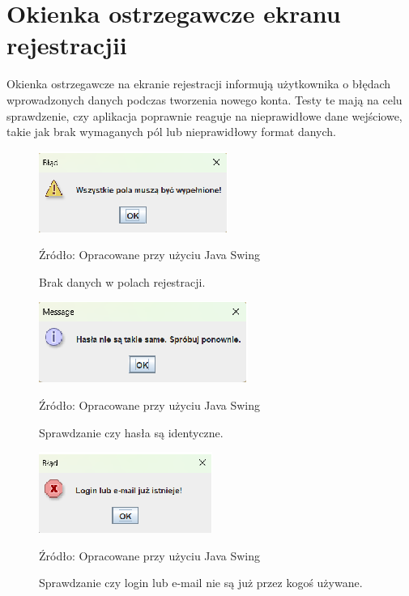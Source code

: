 \section{Okienka ostrzegawcze ekranu rejestracjii}
Okienka ostrzegawcze na ekranie rejestracji informują użytkownika o błędach wprowadzonych danych podczas tworzenia nowego konta. Testy te mają na celu sprawdzenie, czy aplikacja poprawnie reaguje na nieprawidłowe dane wejściowe, takie jak brak wymaganych pól lub nieprawidłowy format danych.

\begin{figure}[H]
    \centering
    \includegraphics[width=0.8\linewidth]{figures/r1.eps}
    \caption{Brak danych w polach rejestracji.}
    \label{fig:register_win}
    \small{Źródło: Opracowane przy użyciu Java Swing}
\end{figure}


\begin{figure}[H]
    \centering
    \includegraphics[width=0.8\linewidth]{figures/r2.eps}
    \caption{Sprawdzanie czy hasła są identyczne.}
    \label{fig:register_win}
    \small{Źródło: Opracowane przy użyciu Java Swing}
    \end{figure}


\begin{figure}[H]
    \centering  
    \includegraphics[width=0.8\linewidth]{figures/r3.eps}
    \caption{Sprawdzanie czy login lub e-mail nie są już przez kogoś używane.}
    \label{fig:register_win}
    \small{Źródło: Opracowane przy użyciu Java Swing}
    \end{figure}


